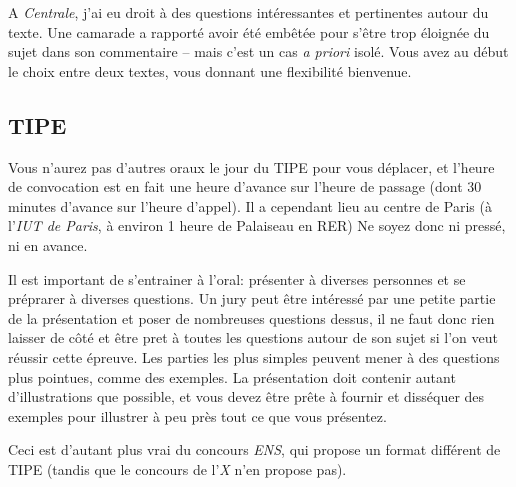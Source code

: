 \documentclass{article}
\begin{document}
A \textit{Centrale}, j'ai eu droit à des questions intéressantes et pertinentes autour du texte.
Une camarade a rapporté avoir été embêtée pour s'être trop éloignée du sujet dans son commentaire -- mais c'est un cas \textit{a priori} isolé.
Vous avez au début le choix entre deux textes, vous donnant une flexibilité bienvenue.

\subsection{TIPE}
Vous n'aurez pas d'autres oraux le jour du TIPE pour vous déplacer, et l'heure de convocation est en fait une heure d'avance sur l'heure de passage (dont 30 minutes d'avance sur l'heure d'appel).
Il a cependant lieu au centre de Paris (à l'\textit{IUT de Paris}, à environ 1 heure de Palaiseau en RER)
Ne soyez donc ni pressé, ni en avance.

Il est important de s'entrainer à l'oral: présenter à diverses personnes et se préprarer à diverses questions.
Un jury peut être intéressé par une petite partie de la présentation et poser de nombreuses questions dessus, il ne faut donc rien laisser de côté et être pret à toutes les questions autour de son sujet si l'on veut réussir cette épreuve.
Les parties les plus simples peuvent mener à des questions plus pointues, comme des exemples.
La présentation doit contenir autant d'illustrations que possible, et vous devez être prêt\textperiodcentered e à fournir et disséquer des exemples pour illustrer à peu près tout ce que vous présentez.

Ceci est d'autant plus vrai du concours \textit{ENS}, qui propose un format différent de TIPE (tandis que le concours de l'\textit{X} n'en propose pas).
\end{document}

